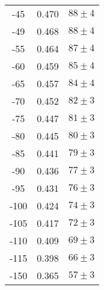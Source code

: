 \begin{table}
\begin{tabular}{|c|c|c|}
-45 & 0.470 & $88\pm4$\\
-49 & 0.468 & $88\pm4$\\
-55 & 0.464 & $87\pm4$\\
-60 & 0.459 & $85\pm4$\\
-65 & 0.457 & $84\pm4$\\
-70 & 0.452 & $82\pm3$\\
-75 & 0.447 & $81\pm3$\\
-80 & 0.445 & $80\pm3$\\
-85 & 0.441 & $79\pm3$\\
-90 & 0.436 & $77\pm3$\\
-95 & 0.431 & $76\pm3$\\
-100 & 0.424 & $74\pm3$\\
-105 & 0.417 & $72\pm3$\\
-110 & 0.409 & $69\pm3$\\
-115 & 0.398 & $66\pm3$\\
-150 & 0.365 & $57\pm3$\\
	\end{tabular}
\end{table}  
